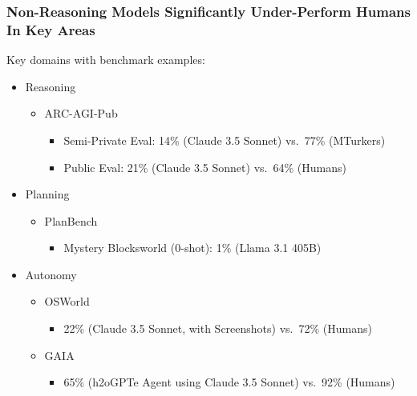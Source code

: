 \documentclass[aspectratio=169]{beamer}
\begin{document}
    \begin{frame}
        \frametitle{Non-Reasoning Models Significantly Under-Perform Humans In Key Areas}
        Key domains with benchmark examples:
        \begin{itemize}
            \item Reasoning
            \begin{itemize}
                \item ARC-AGI-Pub~\parencite{chollet_o3_2024}
                \begin{itemize}
                    \item Semi-Private Eval: 14\% (Claude 3.5 Sonnet) vs.\ 77\% (MTurkers)
                    \item Public Eval: 21\% (Claude 3.5 Sonnet) vs.\ 64\% (Humans)~\parencite{legris2024harcrobustestimatehuman}
                \end{itemize}
            \end{itemize}
            \item Planning
            \begin{itemize}
                \item PlanBench~\parencite{valmeekam2024llmscantplanlrms}
                \begin{itemize}
                    \item Mystery Blocksworld (0-shot): 1\% (Llama 3.1 405B)
                \end{itemize}
            \end{itemize}
            \item Autonomy
            \begin{itemize}
                \item OSWorld~\parencite{OSWorld}
                \begin{itemize}
                    \item 22\% (Claude 3.5 Sonnet, with Screenshots) vs.\ 72\% (Humans)
                \end{itemize}
                \item GAIA~\parencite{mialon2023gaia}
                \begin{itemize}
                    \item 65\% (h2oGPTe Agent using Claude 3.5 Sonnet) vs.\ 92\% (Humans)
                \end{itemize}
            \end{itemize}
        \end{itemize}
    \end{frame}
\end{document}
